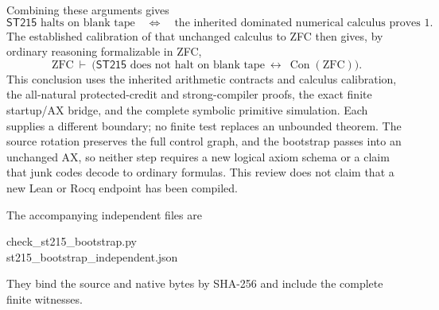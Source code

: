 Combining these arguments gives
\[
 \mathsf{ST215}\text{ halts on blank tape}
 \quad\Longleftrightarrow\quad
 \text{the inherited dominated numerical calculus proves }1.
\]
The established calibration of that unchanged calculus to ZFC then
gives, by ordinary reasoning formalizable in ZFC,
\[
 \mathrm{ZFC}\ \vdash\
 \bigl(\mathsf{ST215}\text{ does not halt on blank tape}
       \ \longleftrightarrow\ \operatorname{Con}(\mathrm{ZFC})\bigr).
\]
This conclusion uses the inherited arithmetic contracts and calculus
calibration, the all-natural protected-credit and strong-compiler proofs,
the exact finite startup/AX bridge, and the complete symbolic primitive
simulation.  Each supplies a different boundary; no finite test replaces
an unbounded theorem.  The source rotation preserves the full control
graph, and the bootstrap passes into an unchanged AX, so neither step
requires a new logical axiom schema or a claim that junk codes decode
to ordinary formulas.  This review does not claim that a new Lean or
Rocq endpoint has been compiled.

The accompanying independent files are
\begin{center}\small\ttfamily
check\_st215\_bootstrap.py\\
st215\_bootstrap\_independent.json
\end{center}
They bind the source and native bytes by SHA-256 and include the complete
finite witnesses.
